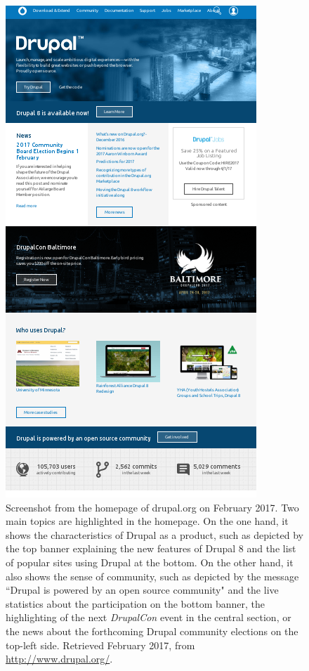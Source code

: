 \begin{figure}[H]
	\centering
	\includegraphics[scale=0.7]{img/drupal_org_today.png}
	\caption[Drupal.org on  February 2017]%
    {Screenshot from the homepage of drupal.org on  February 2017. Two main topics are highlighted in the homepage. On the one hand, it shows the characteristics of Drupal as a product, such as depicted by the top banner explaining the new features of Drupal 8 and the list of popular sites using Drupal at the bottom. On the other hand, it also shows the sense of community, such as depicted by the message ``Drupal is powered by an open source community" and the live statistics about the participation on the bottom banner, the highlighting of the next \textit{DrupalCon} event in the central section, or the news about the forthcoming Drupal community elections on the top-left side. Retrieved  February 2017, from \url{http://www.drupal.org/}.}
	\label{drupal_org_today}
\end{figure}


